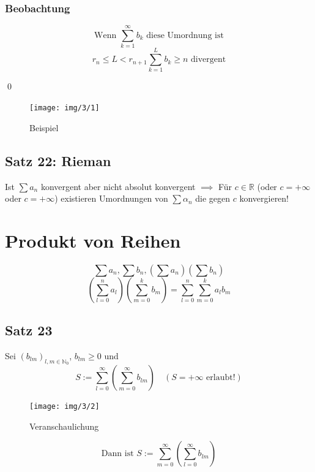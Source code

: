 \documentclass[fleqn]{scrbook}
\newcommand{\R}{\mathbb{R}}
\newcommand{\N}{\mathbb{N}}
\renewenvironment{proof}{{\bfseries Beweis }}{\qed}
\begin{document}
\begin{proof}
\begin{enumerate}[1)]
\subsubsection{Beobachtung}

\[\text{Wenn } \sum_{k=1}^\infty b_k \text{ diese Umordnung ist}\]
\[r_n \leq L < r_{n+1} \boxed{\sum_{k=1}^L b_k \geq n} \text{ divergent}\]

  
  
  
  
  
\end{enumerate}
\end{proof}

\pagebreak 

\begin{figure}[!ht]
  \centering
    \texttt{[image: img/3/1]}
  \caption{Beispiel}
\end{figure}  

\subsection{Satz 22: Rieman}

Ist $\sum a_n$ konvergent aber nicht absolut konvergent $\implies$ Für $c \in \R$ (oder $c=+\infty$ oder $c=+\infty$) existieren Umordnungen von $\sum \alpha_n$ die gegen $c$ konvergieren!

\section{Produkt von Reihen}

\[\sum a_n, \sum b_n, \left( \sum a_n \right) \left( \sum b_n \right)\]
\[\left( \sum_{l=0}^n a_l \right) \left( \sum_{m=0}^k b_m \right) = \sum_{l=0}^n \sum_{m=0}^k a_l b_m \]


\subsection{Satz 23}

Sei $(b_{lm})_{l,m \in \N_0}$, $b_{lm} \geq 0$ und
\[S:= \sum_{l=0}^\infty \left( \sum_{m=0}^\infty b_{lm} \right) \quad (S= + \infty \text{ erlaubt!})\]

\begin{figure}[!ht]
  \centering
    \texttt{[image: img/3/2]}
  \caption{Veranschaulichung}
\end{figure}  

\[\text{Dann ist } S:= \sum_{m=0}^\infty \left( \sum_{l=0}^\infty b_{lm} \right)\]
\end{document}
